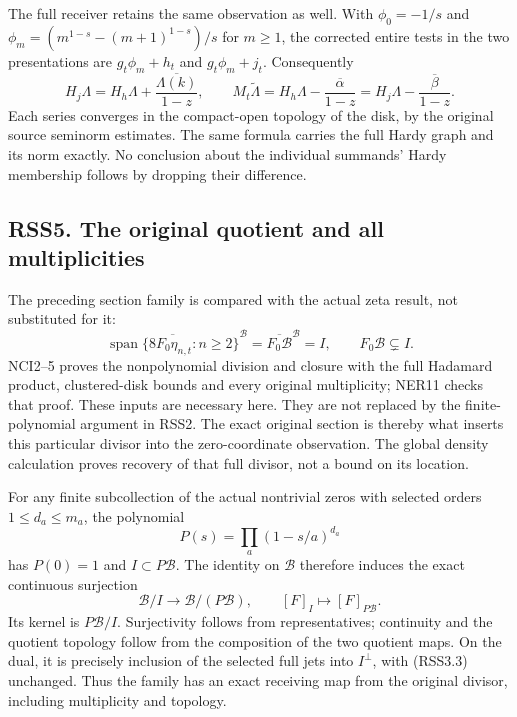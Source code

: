 The full receiver retains the same observation as well. With
\(\phi_0=-1/s\) and \(\phi_m=(m^{1-s}-(m+1)^{1-s})/s\) for \(m\ge1\),
the corrected entire tests in the two presentations are
\(g_t\phi_m+h_t\) and \(g_t\phi_m+j_t\). Consequently \[
H_j\Lambda=H_h\Lambda+\frac{\overline{\Lambda(k)}}{1-z},\qquad
M_t\widetilde\Lambda
=H_h\Lambda-\frac{\overline\alpha}{1-z}
=H_j\Lambda-\frac{\overline\beta}{1-z}.
\tag{RSS4.4}
\] Each series converges in the compact-open topology of the disk, by
the original source seminorm estimates. The same formula carries the
full Hardy graph and its norm exactly. No conclusion about the
individual summands' Hardy membership follows by dropping their
difference.

\subsection{RSS5. The original quotient and all
multiplicities}\label{rss5.-the-original-quotient-and-all-multiplicities}

The preceding section family is compared with the actual zeta result,
not substituted for it: \[
\overline{\operatorname{span}\{8F_0\eta_{n,t}:n\ge2\}}^{\mathcal B}
=\overline{F_0\mathcal B}^{\mathcal B}=I,
\qquad F_0\mathcal B\subsetneq I.
\tag{RSS5.1}
\] NCI2--5 proves the nonpolynomial division and closure with the full
Hadamard product, clustered-disk bounds and every original multiplicity;
NER11 checks that proof. These inputs are necessary here. They are not
replaced by the finite-polynomial argument in RSS2. The exact original
section is thereby what inserts this particular divisor into the
zero-coordinate observation. The global density calculation proves
recovery of that full divisor, not a bound on its location.

For any finite subcollection of the actual nontrivial zeros with
selected orders \(1\le d_a\le m_a\), the polynomial \[
P(s)=\prod_a(1-s/a)^{d_a}
\tag{RSS5.2}
\] has \(P(0)=1\) and \(I\subset P\mathcal B\). The identity on
\(\mathcal B\) therefore induces the exact continuous surjection \[
\mathcal B/I\longrightarrow\mathcal B/(P\mathcal B),\qquad
[F]_I\longmapsto[F]_{P\mathcal B}.
\tag{RSS5.3}
\] Its kernel is \(P\mathcal B/I\). Surjectivity follows from
representatives; continuity and the quotient topology follow from the
composition of the two quotient maps. On the dual, it is precisely
inclusion of the selected full jets into \(I^\perp\), with (RSS3.3)
unchanged. Thus the family has an exact receiving map from the original
divisor, including multiplicity and topology.

